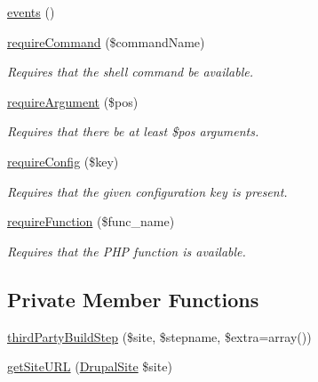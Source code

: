 \begin{DoxyCompactItemize}
\item 
\hyperlink{classGenericCommand_ac45bd478789164f7c5fc219ead8cf9d2}{events} ()
\item 
\hyperlink{classGenericCommand_a7153033aa09664492cfb43ed990fd763}{require\-Command} (\$command\-Name)
\begin{DoxyCompactList}\small\item\em Requires that the shell command be available. \end{DoxyCompactList}\item 
\hyperlink{classGenericCommand_a5707289b6d0b2d8afd0bc63a82e99ad1}{require\-Argument} (\$pos)
\begin{DoxyCompactList}\small\item\em Requires that there be at least \$pos arguments. \end{DoxyCompactList}\item 
\hyperlink{classGenericCommand_a5161604bad2812fb55f62f5258dd4830}{require\-Config} (\$key)
\begin{DoxyCompactList}\small\item\em Requires that the given configuration key is present. \end{DoxyCompactList}\item 
\hyperlink{classGenericCommand_adc40591203a5344603b7365f12829cd8}{require\-Function} (\$func\-\_\-name)
\begin{DoxyCompactList}\small\item\em Requires that the P\-H\-P function is available. \end{DoxyCompactList}\end{DoxyCompactItemize}
\subsection*{Private Member Functions}
\begin{DoxyCompactItemize}
\item 
\hyperlink{classSiteBuildCommand_a86599dd03da2052d7b8bfd75a820dc02}{third\-Party\-Build\-Step} (\$site, \$stepname, \$extra=array())
\item 
\hyperlink{classSiteBuildCommand_ade1f18b278b655fb5543bc1ec638b442}{get\-Site\-U\-R\-L} (\hyperlink{classDrupalSite}{Drupal\-Site} \$site)
\end{DoxyCompactItemize}


